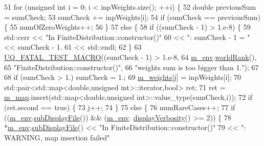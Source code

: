 \begin{DoxyCode}
51   \textcolor{keywordflow}{for} (\textcolor{keywordtype}{unsigned} \textcolor{keywordtype}{int} i = 0; i < inpWeights.size(); ++i) \{
52     \textcolor{keywordtype}{double} previousSum = sumCheck;
53     sumCheck += inpWeights[i];
54     \textcolor{keywordflow}{if} (sumCheck == previousSum) \{
55       numOfZeroWeights++;
56     \}
57     \textcolor{keywordflow}{else} \{
58       \textcolor{keywordflow}{if} ((sumCheck - 1) > 1.e-8) \{
59         std::cerr << \textcolor{stringliteral}{"In FiniteDistribution::constructor()"}
60                   << \textcolor{stringliteral}{": sumCheck - 1 = "} << sumCheck - 1.
61                   << std::endl;
62       \}
63       \hyperlink{_defines_8h_a56d63d18d0a6d45757de47fcc06f574d}{UQ\_FATAL\_TEST\_MACRO}((sumCheck - 1) > 1.e-8,
64                           \hyperlink{class_q_u_e_s_o_1_1_finite_distribution_a1e3d075444dbb96d4d31b51a7eafed41}{m\_env}.\hyperlink{class_q_u_e_s_o_1_1_base_environment_a78b57112bbd0e6dd0e8afec00b40ffa7}{worldRank}(),
65                           \textcolor{stringliteral}{"FiniteDistribution::constructor()"},
66                           \textcolor{stringliteral}{"weights sum is too bigger than 1."});
67 
68       \textcolor{keywordflow}{if} (sumCheck > 1.) sumCheck = 1.;
69       \hyperlink{class_q_u_e_s_o_1_1_finite_distribution_a37ce51dce9fa6b755277281d6dd7c052}{m\_weights}[j] = inpWeights[i];
70       std::pair<std::map<double,unsigned int>::iterator,\textcolor{keywordtype}{bool}> ret;
71       ret = \hyperlink{class_q_u_e_s_o_1_1_finite_distribution_a7b0ba94a9f10793519056eaf612cbeb1}{m\_map}.insert(std::map<double,unsigned int>::value\_type(sumCheck,i));
72       \textcolor{keywordflow}{if} (ret.second == \textcolor{keyword}{true}) \{
73         j++;
74       \}
75       \textcolor{keywordflow}{else} \{
76         numRareCases++;
77         \textcolor{keywordflow}{if} ((\hyperlink{class_q_u_e_s_o_1_1_finite_distribution_a1e3d075444dbb96d4d31b51a7eafed41}{m\_env}.\hyperlink{class_q_u_e_s_o_1_1_base_environment_a8a0064746ae8dddfece4229b9ad374d6}{subDisplayFile}()) && (\hyperlink{class_q_u_e_s_o_1_1_finite_distribution_a1e3d075444dbb96d4d31b51a7eafed41}{m\_env}.
      \hyperlink{class_q_u_e_s_o_1_1_base_environment_a1fe5f244fc0316a0ab3e37463f108b96}{displayVerbosity}() >= 2)) \{
78            *\hyperlink{class_q_u_e_s_o_1_1_finite_distribution_a1e3d075444dbb96d4d31b51a7eafed41}{m\_env}.\hyperlink{class_q_u_e_s_o_1_1_base_environment_a8a0064746ae8dddfece4229b9ad374d6}{subDisplayFile}() << \textcolor{stringliteral}{"In FiniteDistribution::constructor()"}
79                                    << \textcolor{stringliteral}{": WARNING, map insertion failed"}

\end{DoxyCode}
